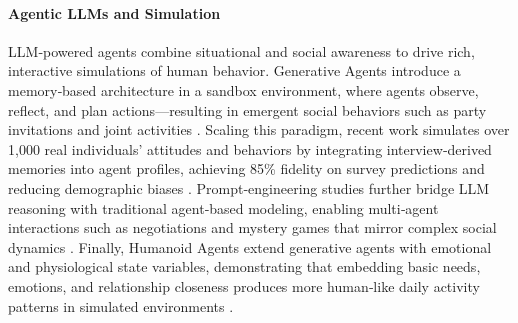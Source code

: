 \paragraph{Agentic LLMs and Simulation}

LLM‑powered agents combine situational and social awareness to drive rich, interactive simulations of human behavior. Generative Agents introduce a memory‑based architecture in a sandbox environment, where agents observe, reflect, and plan actions—resulting in emergent social behaviors such as party invitations and joint activities \citep{park2023generative}.
Scaling this paradigm, recent work simulates over 1,000 real individuals’ attitudes and behaviors by integrating interview‑derived memories into agent profiles, achieving 85\% fidelity on survey predictions and reducing demographic biases \citep{park2024generative}.
Prompt‑engineering studies further bridge LLM reasoning with traditional agent‑based modeling, enabling multi‑agent interactions such as negotiations and mystery games that mirror complex social dynamics \citep{junprung2023exploring}.
Finally, Humanoid Agents extend generative agents with emotional and physiological state variables, demonstrating that embedding basic needs, emotions, and relationship closeness produces more human‑like daily activity patterns in simulated environments \citep{wang2023humanoid}.








